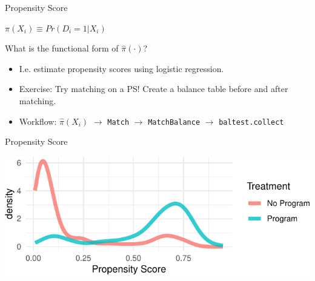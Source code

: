 \documentclass[ignorenonframetext,]{beamer}
\newenvironment{Shaded}{\begin{snugshade}}{\end{snugshade}}
\newcommand{\KeywordTok}[1]{\textcolor[rgb]{0.13,0.29,0.53}{\textbf{#1}}}
\newcommand{\DataTypeTok}[1]{\textcolor[rgb]{0.13,0.29,0.53}{#1}}
\newcommand{\StringTok}[1]{\textcolor[rgb]{0.31,0.60,0.02}{#1}}
\newcommand{\CommentTok}[1]{\textcolor[rgb]{0.56,0.35,0.01}{\textit{#1}}}
\newcommand{\NormalTok}[1]{#1}
\begin{document}
\begin{frame}[fragile]{Propensity Score}

\(\pi(X_i) \equiv Pr(D_i = 1|X_i)\)

What is the functional form of \(\hat{\pi}(\cdot)\)?

\begin{itemize}
\item
  I.e. estimate propensity scores using logistic regression.
\item
  Exercise: Try matching on a PS! Create a balance table before and
  after matching.
\item
  Workflow: \(\hat{\pi}(X_i)\) \(\to\) \texttt{Match} \(\to\)
  \texttt{MatchBalance} \(\to\) \texttt{baltest.collect}
\end{itemize}

\end{frame}

\begin{frame}[fragile]{Propensity Score}

\begin{Shaded}
\end{Shaded}

\begin{center}\includegraphics{soo_matching_files/figure-beamer/unnamed-chunk-11-1} \end{center}

\end{frame}
\end{document}
